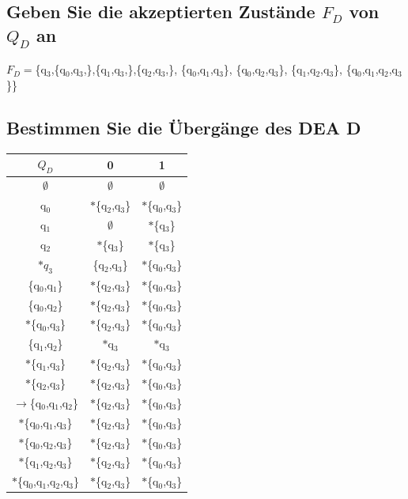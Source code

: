 \documentclass[11pt]{article} %
\begin{document}
\subsection{Geben Sie die akzeptierten Zustände $F_{D}$ von $Q_{D}$ an}
$F_{D} =$\{q$_{3}$,\{q$_{0}$,q$_{3}$,\},\{q$_{1}$,q$_{3}$,\},\{q$_{2}$,q$_{3}$,\},
\{q$_{0}$,q$_{1}$,q$_{3}$\},
\{q$_{0}$,q$_{2}$,q$_{3}$\},
\{q$_{1}$,q$_{2}$,q$_{3}$\},
\{q$_{0}$,q$_{1}$,q$_{2}$,q$_{3}$\}\}
\subsection{ Bestimmen Sie die Übergänge des DEA D}
\begin{tabular}{c|c|c}
$Q_{D}$&0&1\\
\hline
$\emptyset$ &$\emptyset$&$\emptyset$\\
q$_{0}$ &$\ast$\{q$_{2}$,q$_{3}$\}&$\ast$\{q$_{0}$,q$_{3}$\}\\
q$_{1}$ & $\emptyset$ &$\ast$\{q$_{3}$\} \\
q$_{2}$ &$\ast$\{q$_{3}$\} &$\ast$\{q$_{3}$\}\\
$\ast q_{3}$ & \{q$_{2}$,q$_{3}$\} &$\ast$\{q$_{0}$,q$_{3}$\}\\
\{q$_{0}$,q$_{1}$\}&$\ast$\{q$_{2}$,q$_{3}$\}&$\ast$\{q$_{0}$,q$_{3}$\}\\
\{q$_{0}$,q$_{2}$\}&$\ast$\{q$_{2}$,q$_{3}$\}&$\ast$\{q$_{0}$,q$_{3}$\}\\
$\ast$\{q$_{0}$,q$_{3}$\}&$\ast$\{q$_{2}$,q$_{3}$\}&$\ast$\{q$_{0}$,q$_{3}$\}\\
\{q$_{1}$,q$_{2}$\}&$\ast$q$_{3}$&$\ast$q$_{3}$\\
$\ast$\{q$_{1}$,q$_{3}$\}&$\ast$\{q$_{2}$,q$_{3}$\}&$\ast$\{q$_{0}$,q$_{3}$\}\\
$\ast$\{q$_{2}$,q$_{3}$\}&$\ast$\{q$_{2}$,q$_{3}$\}&$\ast$\{q$_{0}$,q$_{3}$\}\\
$\to$\{q$_{0}$,q$_{1}$,q$_{2}$\}&$\ast$\{q$_{2}$,q$_{3}$\}&$\ast$\{q$_{0}$,q$_{3}$\}\\
$\ast$\{q$_{0}$,q$_{1}$,q$_{3}$\}&$\ast$\{q$_{2}$,q$_{3}$\}&$\ast$\{q$_{0}$,q$_{3}$\}\\
$\ast$\{q$_{0}$,q$_{2}$,q$_{3}$\}&$\ast$\{q$_{2}$,q$_{3}$\}&$\ast$\{q$_{0}$,q$_{3}$\}\\
$\ast$\{q$_{1}$,q$_{2}$,q$_{3}$\}&$\ast$\{q$_{2}$,q$_{3}$\}&$\ast$\{q$_{0}$,q$_{3}$\}\\
$\ast$\{q$_{0}$,q$_{1}$,q$_{2}$,q$_{3}$\}&$\ast$\{q$_{2}$,q$_{3}$\}&$\ast$\{q$_{0}$,q$_{3}$\}\\
   \end{tabular}
\end{document}
